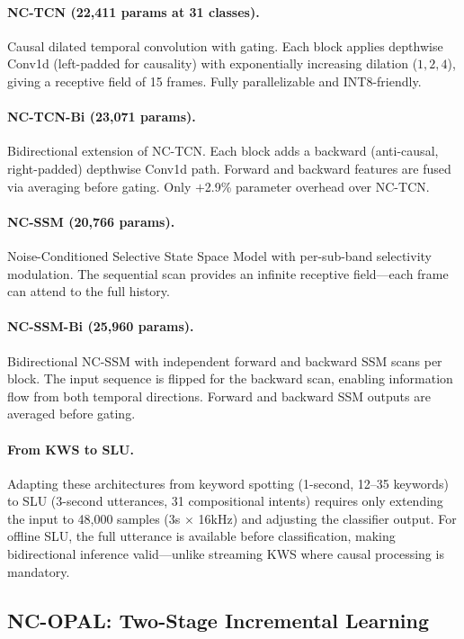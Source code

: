 \documentclass[11pt]{article}
\begin{document}
\paragraph{NC-TCN (22,411 params at 31 classes).}
Causal dilated temporal convolution with gating.
Each block applies depthwise Conv1d (left-padded for causality) with exponentially increasing dilation ($1, 2, 4$), giving a receptive field of 15 frames.
Fully parallelizable and INT8-friendly.

\paragraph{NC-TCN-Bi (23,071 params).}
Bidirectional extension of NC-TCN.
Each block adds a backward (anti-causal, right-padded) depthwise Conv1d path.
Forward and backward features are fused via averaging before gating.
Only $+$2.9\% parameter overhead over NC-TCN.

\paragraph{NC-SSM (20,766 params).}
Noise-Conditioned Selective State Space Model with per-sub-band selectivity modulation.
The sequential scan provides an infinite receptive field---each frame can attend to the full history.

\paragraph{NC-SSM-Bi (25,960 params).}
Bidirectional NC-SSM with independent forward and backward SSM scans per block.
The input sequence is flipped for the backward scan, enabling information flow from both temporal directions.
Forward and backward SSM outputs are averaged before gating.

\paragraph{From KWS to SLU.}
Adapting these architectures from keyword spotting (1-second, 12--35 keywords) to SLU (3-second utterances, 31 compositional intents) requires only extending the input to 48,000 samples (3s $\times$ 16kHz) and adjusting the classifier output.
For offline SLU, the full utterance is available before classification, making bidirectional inference valid---unlike streaming KWS where causal processing is mandatory.

\subsection{NC-OPAL: Two-Stage Incremental Learning}
\label{sec:ncopal}
\end{document}
